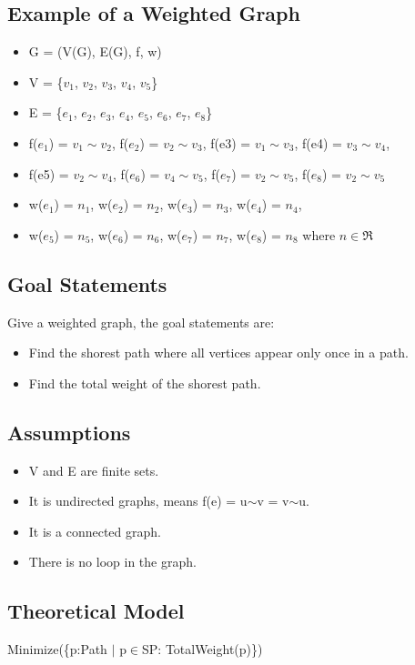 \documentclass[12pt]{article}
\begin{document}
\subsection{Example of a Weighted Graph}
\begin{itemize}
    \item G = (V(G), E(G), f, w)
    \item V = \{$v_1$, $v_2$, $v_3$, $v_4$, $v_5$\}
    \item E = \{$e_1$, $e_2$, $e_3$, $e_4$, $e_5$, $e_6$, $e_7$, $e_8$\}
    \item f($e_1$) = $v_1\sim v_2$, f($e_2$) = $v_2\sim v_3$, f(e3) = $v_1\sim v_3$, f(e4) = $v_3\sim v_4$, 
    \item f(e5) = $v_2\sim v_4$, f($e_6$) = $v_4\sim v_5$, f($e_7$) = $v_2\sim v_5$, f($e_8$) = $v_2\sim v_5$
    \item w($e_1$) = $n_1$, w($e_2$) = $n_2$, w($e_3$) = $n_3$, w($e_4$) = $n_4$,
    \item w($e_5$) = $n_5$, w($e_6$) = $n_6$, w($e_7$) = $n_7$, w($e_8$) = $n_8$ where $n\in\Re$
\end{itemize}

\subsection{Goal Statements}
Give a weighted graph, the goal statements are:
\begin{itemize}
    \item Find the shorest path where all vertices appear only once in a path.
    \item Find the total weight of the shorest path.
\end{itemize}

\subsection{Assumptions}
\begin{itemize}
    \item V and E are finite sets.
    \item It is undirected graphs, means f(e) = u$\sim$v = v$\sim$u.
    \item It is a connected graph.
    \item There is no loop in the graph.
\end{itemize}

\subsection{Theoretical Model}
Minimize(\{p:Path $|$ p$\in$SP: TotalWeight(p)\})
\end{document}
